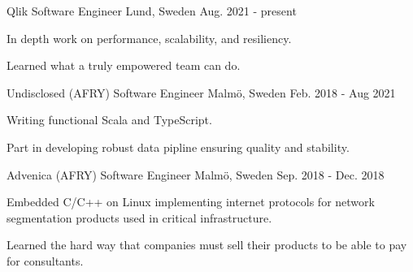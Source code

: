 


\begin{cventries}


\cventry
{Qlik} %
{Software Engineer} %
{Lund, Sweden} %
{Aug. 2021 - present} %
{ %
\begin{cvitems}
\item {In depth work on performance, scalability, and resiliency.}
\item {Learned what a truly empowered team can do.}
\end{cvitems}
}


\cventry
{Undisclosed (AFRY)} %
{Software Engineer} %
{Malmö, Sweden} %
{Feb. 2018 - Aug 2021} %
{ %
\begin{cvitems}
\item {Writing functional Scala and TypeScript.}
\item {Part in developing robust data pipline ensuring quality and stability.}
\end{cvitems}
}


\cventry
{Advenica (AFRY)} %
{Software Engineer} %
{Malmö, Sweden} %
{Sep. 2018 - Dec. 2018} %
{ %
\begin{cvitems}
\item {
Embedded C/C++ on Linux implementing internet protocols for network
segmentation products used in critical infrastructure.}
\item{
Learned the hard way that companies must sell their products to be
able to pay for consultants.}
\end{cvitems}
}

\end{cventries}
